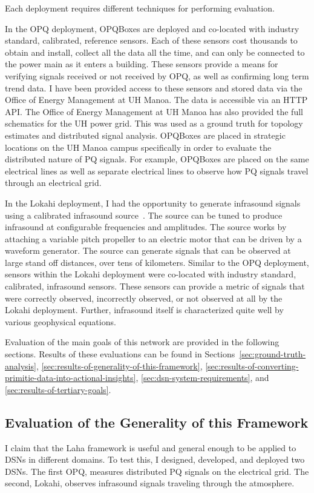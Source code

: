 Each deployment requires different techniques for performing evaluation.

In the OPQ deployment, OPQBoxes are deployed and co-located with industry standard, calibrated, reference sensors. Each of these sensors cost thousands to obtain and install, collect all the data all the time, and can only be connected to the power main as it enters a building. These sensors provide a means for verifying signals received or not received by OPQ, as well as confirming long term trend data. I have been provided access to these sensors and stored data via the Office of Energy Management at UH Manoa. The data is accessible via an HTTP API. The Office of Energy Management at UH Manoa has also provided the full schematics for the UH power grid. This was used as a ground truth for topology estimates and distributed signal analysis. OPQBoxes are placed in strategic locations on the UH Manoa campus specifically in order to evaluate the distributed nature of PQ signals. For example, OPQBoxes are placed on the same electrical lines as well as separate electrical lines to observe how PQ signals travel through an electrical grid.

In the Lokahi deployment, I had the opportunity to generate infrasound signals using a calibrated infrasound source~\cite{park2009rotary}. The source can be tuned to produce infrasound at configurable frequencies and amplitudes. The source works by attaching a variable pitch propeller to an electric motor that can be driven by a waveform generator. The source can generate signals that can be observed at large stand off distances, over tens of kilometers. Similar to the OPQ deployment, sensors within the Lokahi deployment were co-located with industry standard, calibrated, infrasound sensors. These sensors can provide a metric of signals that were correctly observed, incorrectly observed, or not observed at all by the Lokahi deployment. Further, infrasound itself is characterized quite well by various geophysical equations.

Evaluation of the main goals of this network are provided in the following sections. Results of these evaluations can be found in Sections~\ref{sec:ground-truth-analysis}, \ref{sec:results-of-generality-of-this-framework}, \ref{sec:results-of-converting-primitie-data-into-actional-insights}, \ref{sec:dsn-system-requirements}, and \ref{sec:results-of-tertiary-goals}.

\subsection{Evaluation of the Generality of this Framework}\label{subsec:evaluation-of-the-generality-of-this-framework}
I claim that the Laha framework is useful and general enough to be applied to DSNs in different domains. To test this, I designed, developed, and deployed two DSNs. The first OPQ, measures distributed PQ signals on the electrical grid. The second, Lokahi, observes infrasound signals traveling through the atmosphere.

